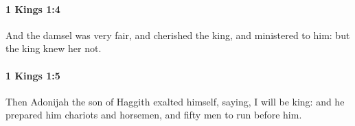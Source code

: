 		\paragraph{1 Kings 1:4} %
			\label{1KINGS-1-4}

			And the damsel was very fair, and cherished the king, and ministered to him: but the king knew her not.


		\paragraph{1 Kings 1:5} %
			\label{1KINGS-1-5}

			Then Adonijah the son of Haggith exalted himself, saying, I will be king: and he prepared him chariots and horsemen, and fifty men to run before him.


